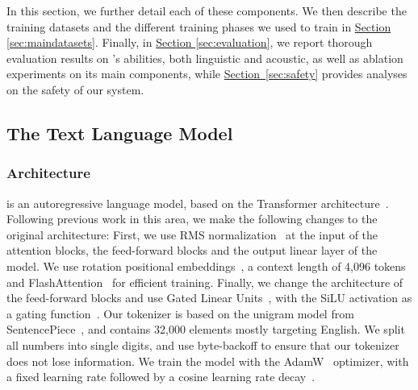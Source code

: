 In this section, we further detail each of these components. We then describe the training datasets and the different training phases we used to train \ours{} in \hyperref[sec:maindatasets]{Section \ref{sec:maindatasets}}. 
Finally, in \hyperref[sec:evaluation]{Section \ref{sec:evaluation}}, we report thorough evaluation results on \ours{}'s abilities, both linguistic and acoustic, as well as ablation experiments on its main components, while \hyperref[sec:safety]{Section~\ref{sec:safety}} provides analyses on the safety of our system.

\subsection{The \helium Text Language Model}
\label{sec:helium}
\subsubsection{Architecture}
\helium is an autoregressive language model, based on the Transformer architecture~\citep{attentionvaswani}.
Following previous work in this area, we make the following changes to the original architecture: 
First, we use RMS normalization~\citep{zhang2019root} at the input of the attention blocks, the feed-forward blocks and the output linear layer of the model.
We use rotation positional embeddings~\citep[RoPE]{su2024roformer}, a context length of 4,096 tokens and FlashAttention~\citep{dao2022flashattention} for efficient training.
Finally, we change the architecture of the feed-forward blocks and use Gated Linear Units~\citep{shazeer2020glu}, with the SiLU activation as a gating function~\citep{hendrycks2016gaussian}.
Our tokenizer is based on the unigram model from SentencePiece~\citep{kudo2018sentencepiece}, and contains 32,000 elements mostly targeting English.
We split all numbers into single digits, and use byte-backoff to ensure that our tokenizer does not lose information.
We train the model with the AdamW~\citep{loshchilov2017decoupled} optimizer, with a fixed learning rate followed by a cosine learning rate decay~\citep{loshchilov2016sgdr}.

